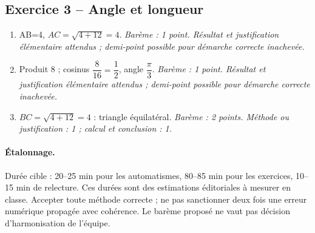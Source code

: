 \subsection*{Exercice 3 -- Angle et longueur}
\begin{enumerate}
\item AB=4, $AC=\sqrt{4+12}=4$. \textit{Barème : 1 point. Résultat et justification élémentaire attendus ; demi-point possible pour démarche correcte inachevée.}
\item Produit 8 ; cosinus $\dfrac{8}{16}=\dfrac{1}{2}$, angle $\dfrac{\pi}{3}$. \textit{Barème : 1 point. Résultat et justification élémentaire attendus ; demi-point possible pour démarche correcte inachevée.}
\item $BC=\sqrt{4+12}=4$ : triangle équilatéral. \textit{Barème : 2 points. Méthode ou justification : 1 ; calcul et conclusion : 1.}
\end{enumerate}
\paragraph{Étalonnage.} Durée cible : 20–25 min pour les automatismes, 80–85 min pour les exercices, 10–15 min de relecture. Ces durées sont des estimations éditoriales à mesurer en classe. Accepter toute méthode correcte ; ne pas sanctionner deux fois une erreur numérique propagée avec cohérence. Le barème proposé ne vaut pas décision d’harmonisation de l’équipe.
